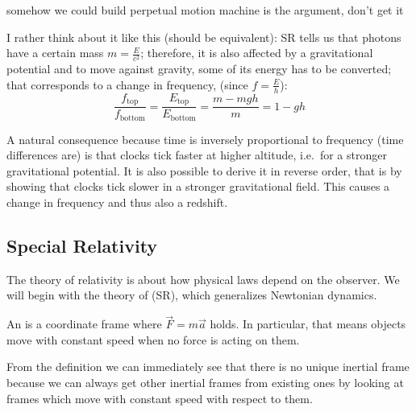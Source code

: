\begin{ex}
somehow we could build perpetual motion machine is the argument, don't get it

I rather think about it like this (should be equivalent): SR tells us that photons have a certain mass $m = \frac{E}{c^2}$; therefore, it is also affected by a gravitational potential and to move against gravity, some of its energy has to be converted; that corresponds to a change in frequency, (since $f = \frac{E}{h}$):
\begin{equation}
\frac{f_\text{top}}{f_\text{bottom}} = \frac{E_\text{top}}{E_\text{bottom}} = \frac{m - m g h}{m} = 1 - g h
\end{equation}
\end{ex}

A natural consequence because time is inversely proportional to frequency (time differences are) is that clocks tick faster at higher altitude, i.e.~for a stronger gravitational potential. It is also possible to derive it in reverse order, that is by showing that clocks tick slower in a stronger gravitational field. This causes a change in frequency and thus also a redshift.






	\subsection{Special Relativity}
The theory of relativity is about how physical laws depend on the observer. We will begin with the theory of  (SR), which generalizes Newtonian dynamics.

\begin{defi}
An  is a coordinate frame where $\vec{F} = m \vec{a}$ holds. In particular, that means objects move with constant speed when no force is acting on them.
\end{defi}
From the definition we can immediately see that there is no unique inertial frame because we can always get other inertial frames from existing ones by looking at frames which move with constant speed with respect to them.

